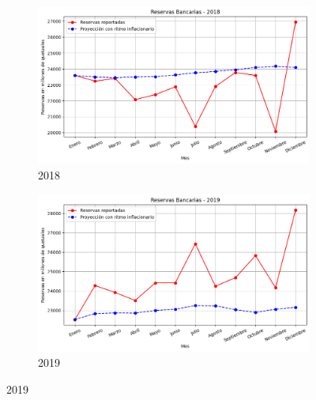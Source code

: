 \begin{figure}[H]
  \centering
  \captionsetup{justification=centering}

  \begin{subfigure}[b]{0.495\textwidth}
    \includegraphics[width=\linewidth]{imagenes/reservas_2018.png}
    \caption{2018}
    \label{proyeccion reservas inicio de año}
  \end{subfigure}
  \begin{subfigure}[b]{0.495\textwidth}
    \includegraphics[width=\linewidth]{imagenes/reservas_2019.png}
    \caption{2019}
  \end{subfigure}
  

\end{figure}
